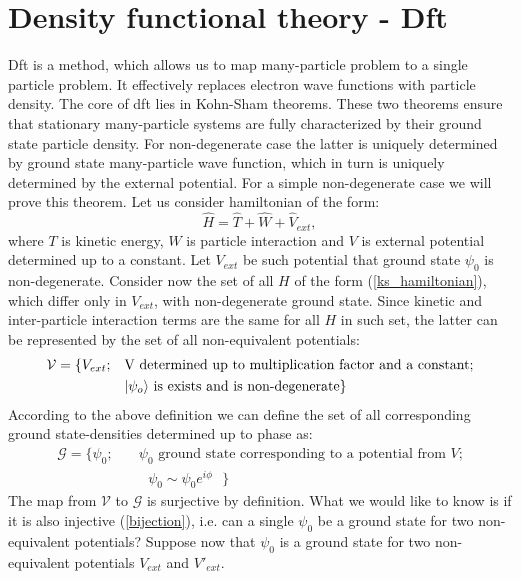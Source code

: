 \documentclass[openany, longbibliography,slovene,a4paper,12pt]{article}
\begin{document}
\section{Density functional theory - Dft}
Dft is a method, which allows us to map many-particle problem to a
single particle problem. It effectively replaces electron wave functions with
particle density.  The core of dft lies in Kohn-Sham theorems. These two theorems
ensure that stationary many-particle systems are fully characterized by their
ground state particle density. For non-degenerate case the latter is uniquely determined
by ground state many-particle wave function, which in turn is uniquely determined by the
external potential. For a simple non-degenerate case we will prove this theorem. Let us consider hamiltonian of the form:
\begin{equation} \label{ks_hamiltonian}
\hat H = \hat T + \hat W + \hat V_{ext},
\end{equation}
where $T$ is kinetic energy, $W$ is particle interaction and $V$ is external
potential determined up to a constant. Let $V_{ext}$ be such potential that
ground state $\psi_0$ is non-degenerate. Consider now the set of all $H$ of the
form (\ref{ks_hamiltonian}), which
differ only in $V_{ext}$, with non-degenerate ground state. Since kinetic and
inter-particle interaction terms are the same for all $H$ in such set, the latter
can be represented by the set of all non-equivalent potentials:
\begin{equation}
  \begin{split}
    \mathcal{V} = \{V_{ext};\quad &\textrm{V determined up to multiplication factor and a constant;}\\
    & \textrm{$\ket{\psi_o}$ is exists and is non-degenerate}\}
    \end{split}
 \end{equation}
According to the above definition we can define the set of all corresponding
ground state-densities determined up to phase as:
\begin{equation}
  \begin{split}
    \mathcal{G} = \{\psi_0; \quad &\textrm{$\psi_0$ ground state corresponding to a potential from $V$;}\\
&\textrm{ $\psi_0\sim\psi_0e^{i\phi}$   }
    \}
    \end{split}
  \end{equation}
The map from $\mathcal{V}$ to $\mathcal{G}$ is surjective by definition. What we
would like to know is if it is also injective  (\ref{bijection}), i.e. can a single $\psi_0$ be a
ground state for two non-equivalent potentials? Suppose now that $\psi_0$ is a
ground state for two non-equivalent potentials $V_{ext}$ and $V'_{ext}$.
\end{document}
